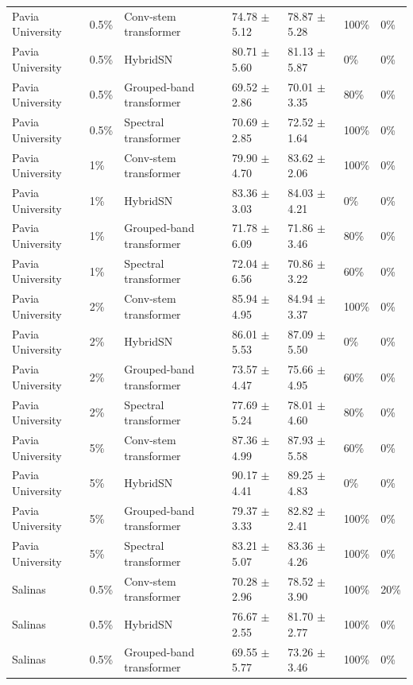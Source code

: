 \begin{table}
{\begin{tabular}{lllllll}
Pavia University & 0.5\% & Conv-stem transformer & 74.78 $\pm$ 5.12 & 78.87 $\pm$ 5.28 & 100\% & 0\% \\
Pavia University & 0.5\% & HybridSN & 80.71 $\pm$ 5.60 & 81.13 $\pm$ 5.87 & 0\% & 0\% \\
Pavia University & 0.5\% & Grouped-band transformer & 69.52 $\pm$ 2.86 & 70.01 $\pm$ 3.35 & 80\% & 0\% \\
Pavia University & 0.5\% & Spectral transformer & 70.69 $\pm$ 2.85 & 72.52 $\pm$ 1.64 & 100\% & 0\% \\
Pavia University & 1\% & Conv-stem transformer & 79.90 $\pm$ 4.70 & 83.62 $\pm$ 2.06 & 100\% & 0\% \\
Pavia University & 1\% & HybridSN & 83.36 $\pm$ 3.03 & 84.03 $\pm$ 4.21 & 0\% & 0\% \\
Pavia University & 1\% & Grouped-band transformer & 71.78 $\pm$ 6.09 & 71.86 $\pm$ 3.46 & 80\% & 0\% \\
Pavia University & 1\% & Spectral transformer & 72.04 $\pm$ 6.56 & 70.86 $\pm$ 3.22 & 60\% & 0\% \\
Pavia University & 2\% & Conv-stem transformer & 85.94 $\pm$ 4.95 & 84.94 $\pm$ 3.37 & 100\% & 0\% \\
Pavia University & 2\% & HybridSN & 86.01 $\pm$ 5.53 & 87.09 $\pm$ 5.50 & 0\% & 0\% \\
Pavia University & 2\% & Grouped-band transformer & 73.57 $\pm$ 4.47 & 75.66 $\pm$ 4.95 & 60\% & 0\% \\
Pavia University & 2\% & Spectral transformer & 77.69 $\pm$ 5.24 & 78.01 $\pm$ 4.60 & 80\% & 0\% \\
Pavia University & 5\% & Conv-stem transformer & 87.36 $\pm$ 4.99 & 87.93 $\pm$ 5.58 & 60\% & 0\% \\
Pavia University & 5\% & HybridSN & 90.17 $\pm$ 4.41 & 89.25 $\pm$ 4.83 & 0\% & 0\% \\
Pavia University & 5\% & Grouped-band transformer & 79.37 $\pm$ 3.33 & 82.82 $\pm$ 2.41 & 100\% & 0\% \\
Pavia University & 5\% & Spectral transformer & 83.21 $\pm$ 5.07 & 83.36 $\pm$ 4.26 & 100\% & 0\% \\
Salinas & 0.5\% & Conv-stem transformer & 70.28 $\pm$ 2.96 & 78.52 $\pm$ 3.90 & 100\% & 20\% \\
Salinas & 0.5\% & HybridSN & 76.67 $\pm$ 2.55 & 81.70 $\pm$ 2.77 & 100\% & 0\% \\
Salinas & 0.5\% & Grouped-band transformer & 69.55 $\pm$ 5.77 & 73.26 $\pm$ 3.46 & 100\% & 0\% \\

\end{tabular}}
\end{table}
